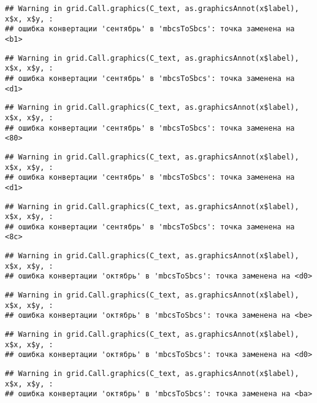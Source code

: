 \documentclass[
]{article}
\begin{document}
\begin{verbatim}
## Warning in grid.Call.graphics(C_text, as.graphicsAnnot(x$label), x$x, x$y, :
## ошибка конвертации 'сентябрь' в 'mbcsToSbcs': точка заменена на <b1>
\end{verbatim}

\begin{verbatim}
## Warning in grid.Call.graphics(C_text, as.graphicsAnnot(x$label), x$x, x$y, :
## ошибка конвертации 'сентябрь' в 'mbcsToSbcs': точка заменена на <d1>
\end{verbatim}

\begin{verbatim}
## Warning in grid.Call.graphics(C_text, as.graphicsAnnot(x$label), x$x, x$y, :
## ошибка конвертации 'сентябрь' в 'mbcsToSbcs': точка заменена на <80>
\end{verbatim}

\begin{verbatim}
## Warning in grid.Call.graphics(C_text, as.graphicsAnnot(x$label), x$x, x$y, :
## ошибка конвертации 'сентябрь' в 'mbcsToSbcs': точка заменена на <d1>
\end{verbatim}

\begin{verbatim}
## Warning in grid.Call.graphics(C_text, as.graphicsAnnot(x$label), x$x, x$y, :
## ошибка конвертации 'сентябрь' в 'mbcsToSbcs': точка заменена на <8c>
\end{verbatim}

\begin{verbatim}
## Warning in grid.Call.graphics(C_text, as.graphicsAnnot(x$label), x$x, x$y, :
## ошибка конвертации 'октябрь' в 'mbcsToSbcs': точка заменена на <d0>
\end{verbatim}

\begin{verbatim}
## Warning in grid.Call.graphics(C_text, as.graphicsAnnot(x$label), x$x, x$y, :
## ошибка конвертации 'октябрь' в 'mbcsToSbcs': точка заменена на <be>
\end{verbatim}

\begin{verbatim}
## Warning in grid.Call.graphics(C_text, as.graphicsAnnot(x$label), x$x, x$y, :
## ошибка конвертации 'октябрь' в 'mbcsToSbcs': точка заменена на <d0>
\end{verbatim}

\begin{verbatim}
## Warning in grid.Call.graphics(C_text, as.graphicsAnnot(x$label), x$x, x$y, :
## ошибка конвертации 'октябрь' в 'mbcsToSbcs': точка заменена на <ba>
\end{verbatim}
\end{document}
